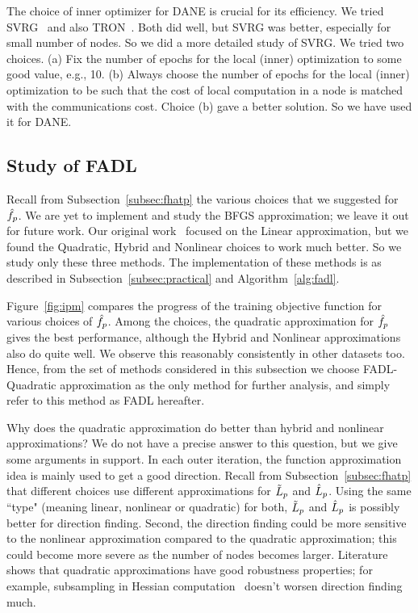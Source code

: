 \documentclass[twoside, 11pt]{article}
\begin{document}
The choice of inner optimizer for DANE is crucial for its efficiency. We tried SVRG~\citep{johnson2013} and also TRON~\citep{lin2008}. Both did well, but SVRG was better, especially for small number of nodes. So we did a more detailed study of SVRG. We tried two choices. (a) Fix the number of epochs for the local (inner) optimization to some good value, e.g., 10. (b) Always choose the number of epochs for the local (inner) optimization to be such that the cost of local computation in a node is matched with the communications cost. Choice (b) gave a better solution. So we have used it for DANE.




\subsection{Study of FADL}
\label{subsec:our}

Recall from Subsection~\ref{subsec:fhatp} the various choices that we suggested for $\hat{f}_p$.
We are yet to implement and study the BFGS approximation; we leave it out for future work.
Our original work~\citep{dhruv2013} focused on the Linear approximation, but we found the Quadratic, Hybrid and Nonlinear choices to work much better. So we study only these three methods. The implementation of these methods is as described in Subsection~\ref{subsec:practical} and Algorithm~\ref{alg:fadl}.

Figure~\ref{fig:ipm} compares the progress of the training objective function for various choices of $\hat{f}_p$. Among the choices, the quadratic approximation for $\hat{f}_p$ gives the best performance, although the Hybrid and Nonlinear approximations also do quite well. We observe this reasonably consistently in other datasets too. Hence, from the set of methods considered in this subsection we choose FADL-Quadratic approximation as the only method for further analysis, and simply refer to this method as FADL hereafter.

Why does the quadratic approximation do better than hybrid and nonlinear approximations? We do not have a precise answer to this question, but we give some arguments in support.
In each outer iteration, the function approximation idea is mainly used to get a good direction. Recall from Subsection~\ref{subsec:fhatp} that different choices use different approximations for $\tilde{L}_p$ and $\hat{L}_p$. Using the same ``type" (meaning linear, nonlinear or quadratic) for both, $\tilde{L}_p$ and $\hat{L}_p$ is possibly better for direction finding. Second, the direction finding could be more sensitive to the nonlinear approximation compared to the quadratic approximation; this could become more severe as the number of nodes becomes larger. Literature shows that quadratic approximations have good robustness properties; for example, subsampling in Hessian computation~\citep{byrd2012} doesn't worsen direction finding much.
\end{document}

